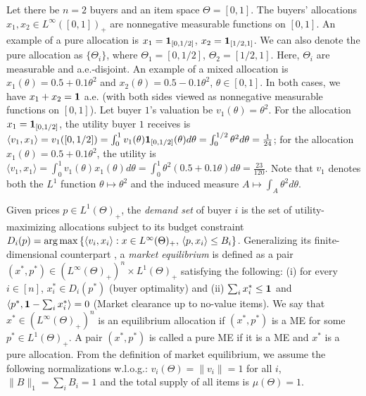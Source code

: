 \begin{example} 
	\normalfont
	Let there be $n=2$ buyers and an item space $\Theta = [0,1]$. The buyers' allocations $x_1, x_2\in L^\infty([0,1])_+$ are nonnegative measurable functions on $[0,1]$. 
	An example of a pure allocation is $x_1 = \mathbf{1}_{[0,1/2]}$, $x_2 = \mathbf{1}_{[1/2,1]}$. We can also denote the pure allocation as $\{\Theta_i\}$, where $\Theta_1 = [0,1/2]$, $\Theta_2 = [1/2,1]$. 
	Here, $\Theta_i$ are measurable and a.e.-disjoint. 
	An example of a mixed allocation is $x_1(\theta) = 0.5 + 0.1 \theta^2$ and $x_2(\theta) = 0.5 - 0.1 \theta^2$, $\theta\in [0,1]$. In both cases, we have $x_1 + x_2 = \mathbf{1}$ a.e. (with both sides viewed as nonnegative measurable functions on $[0,1]$). Let buyer $1$'s valuation be $v_1(\theta) = \theta^2$. For the allocation $x_1 = \mathbf{1}_{[0,1/2]}$, the utility buyer $1$ receives is $\langle v_1, x_1 \rangle = v_1([0,1/2]) = \int_0^1 v_1(\theta)\mathbf{1}_{[0,1/2]}(\theta)d\theta = \int_0^{1/2} \theta^2 d\theta = \frac{1}{24} $; for the allocation $x_1(\theta) = 0.5 + 0.1\theta^2$, the utility is $\langle v_1, x_1 \rangle = \int_0^1 v_1(\theta)x_1(\theta) d\theta = \int_0^1 \theta^2 (0.5+0.1\theta) d\theta = \frac{23}{120}$. Note that $v_1$ denotes both the $L^1$ function $\theta\mapsto\theta^2$ and the induced measure $A\mapsto \int_A \theta^2 d\theta$.
	\label{ex:pure-mixed-allo}
\end{example}

Given prices $p\in L^1(\Theta)_+$, the \emph{demand set} of buyer $i$ is the set of utility-maximizing allocations subject to its budget constraint
$D_i(p) = \operatorname*{arg\,max} \left\{ \langle v_i, x_i\rangle: x\in L^\infty(\Theta)_+,\, \langle p, x_i\rangle \leq B_i \right\}$.
Generalizing its finite-dimensional counterpart \citep{nisan2007algorithmic}, 
a \textit{market equilibrium} is defined as a pair $(x^*, p^*) \in (L^\infty(\Theta)_+)^n \times L^1(\Theta)_+ $ satisfying the following: (i) for every $i\in [n]$, $x^*_i \in D_i(p^*)$ (buyer optimality) and (ii) $\sum_i x^*_i \leq \mathbf{1}$ and $\langle p^*, \mathbf{1} - \sum_i x^*_i\rangle = 0$ (Market clearance up to no-value items).
We say that $x^*\in (L^\infty(\Theta)_+)^n$ is an equilibrium allocation if $(x^*, p^*)$ is a ME for some $p^*\in L^1(\Theta)_+$. A pair $(x^*, p^*)$ is called a pure ME if it is a ME and $x^*$ is a pure allocation.
From the definition of market equilibrium, we assume 
the following normalizations w.l.o.g.: $v_i(\Theta) = \|v_i\| = 1$ for all $i$, $\|B\|_1 = \sum_i B_i = 1$ and the total supply of all items is $\mu(\Theta) = 1$.


